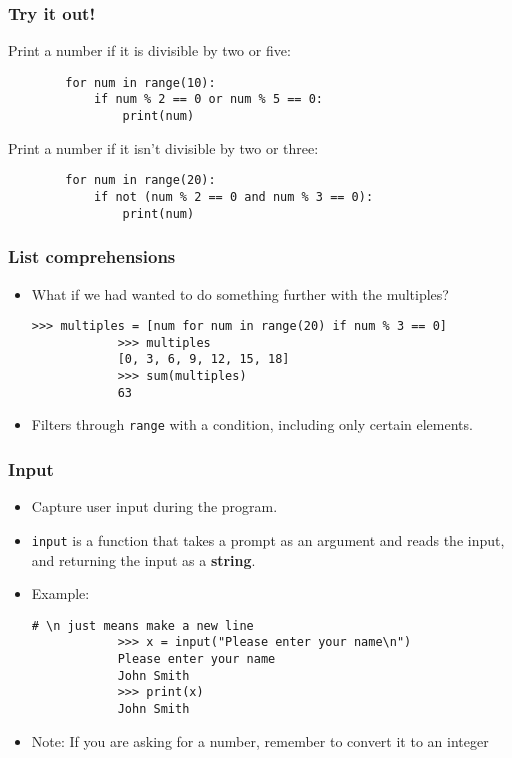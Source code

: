 \documentclass[notes]{beamer}
\begin{document}
	\begin{frame}[fragile]
		\frametitle{Try it out!}
		
		Print a number if it is divisible by two or five:
		
		\begin{lstlisting}
		for num in range(10):
		    if num % 2 == 0 or num % 5 == 0:
		        print(num)
		\end{lstlisting}
		
		Print a number if it isn't divisible by two or three:
		
		\begin{lstlisting}
		for num in range(20):
		    if not (num % 2 == 0 and num % 3 == 0):
		        print(num)
		\end{lstlisting}
	\end{frame}

	\begin{frame}[fragile]
		\frametitle{List comprehensions}
		
		\begin{itemize}
			\item What if we had wanted to do something further with the multiples?
			\begin{lstlisting}[xleftmargin=\dimexpr-\leftmargini, basicstyle=\scriptsize\tt]
			>>> multiples = [num for num in range(20) if num % 3 == 0]
			>>> multiples
			[0, 3, 6, 9, 12, 15, 18]
			>>> sum(multiples)
			63
			\end{lstlisting}

			\item Filters through \lstinline|range| with a condition, including only certain elements.
		\end{itemize}
		
	\end{frame}
	
	\begin{frame}[fragile]
		\frametitle{Input}
		\begin{itemize}
			\item Capture user input during the program.
			\item \lstinline|input| is a function that takes a prompt as an argument and reads the input, and returning the input as a \textbf{string}.
			\pause
			\item Example:
			\begin{lstlisting}[xleftmargin=\dimexpr-\leftmargini, basicstyle=\scriptsize\tt]
			# \n just means make a new line
			>>> x = input("Please enter your name\n")
			Please enter your name
			John Smith
			>>> print(x)
			John Smith
			\end{lstlisting}
			\pause
			\item Note: If you are asking for a number, remember to convert it to an integer
		\end{itemize}
	\end{frame}
	
\end{document}
